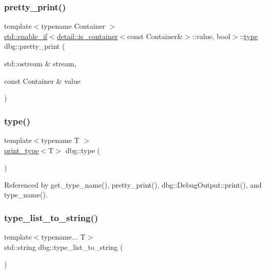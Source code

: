 \mbox{\label{namespacedbg_a1212dc990d58f20efcf5d66eb4a5781c}} 
\subsubsection{\texorpdfstring{pretty\+\_\+print()}{pretty\_print()}\hspace{0.1cm}{\footnotesize\ttfamily [19/19]}}
{\footnotesize\ttfamily template$<$typename Container $>$ \\
\hyperlink{structstd_1_1enable__if}{std\+::enable\+\_\+if}$<$\hyperlink{structdbg_1_1detail_1_1is__container}{detail\+::is\+\_\+container}$<$const Container\&$>$\+::value, bool$>$\+::\hyperlink{namespacedbg_a2365d80e3a3525e6025040383ff8661b}{type} dbg\+::pretty\+\_\+print (\begin{DoxyParamCaption}\item[{std\+::ostream \&}]{stream,  }\item[{const Container \&}]{value }\end{DoxyParamCaption})\hspace{0.3cm}{\ttfamily [inline]}}

\mbox{\label{namespacedbg_a2365d80e3a3525e6025040383ff8661b}} 
\subsubsection{\texorpdfstring{type()}{type()}}
{\footnotesize\ttfamily template$<$typename T $>$ \\
\hyperlink{structdbg_1_1print__type}{print\+\_\+type}$<$T$>$ dbg\+::type (\begin{DoxyParamCaption}{ }\end{DoxyParamCaption})}



Referenced by get\+\_\+type\+\_\+name(), pretty\+\_\+print(), dbg\+::\+Debug\+Output\+::print(), and type\+\_\+name().

\mbox{\label{namespacedbg_aef0097e53230ee373eaabc4981048cac}} 
\subsubsection{\texorpdfstring{type\+\_\+list\+\_\+to\+\_\+string()}{type\_list\_to\_string()}}
{\footnotesize\ttfamily template$<$typename... T$>$ \\
std\+::string dbg\+::type\+\_\+list\+\_\+to\+\_\+string (\begin{DoxyParamCaption}{ }\end{DoxyParamCaption})}



